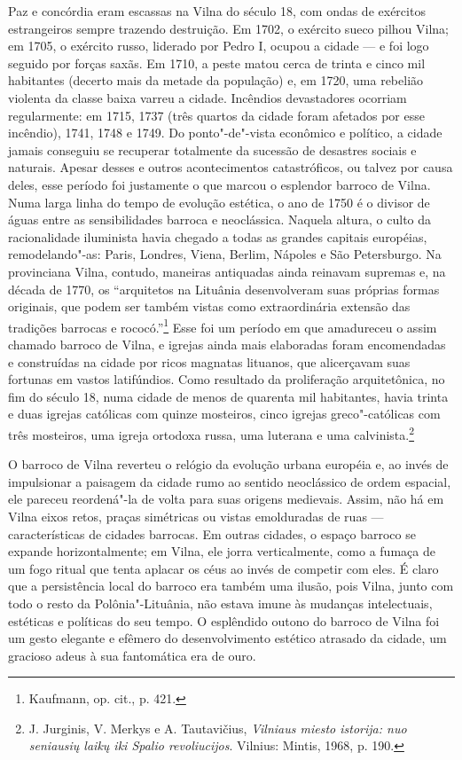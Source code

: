 Paz e concórdia eram escassas na Vilna do século 18, com ondas de
exércitos estrangeiros sempre trazendo destruição. Em 1702, o exército
sueco pilhou Vilna; em 1705, o exército russo, liderado por Pedro I,
ocupou a cidade --- e foi logo seguido por forças saxãs. Em 1710, a peste
matou cerca de trinta e cinco mil habitantes (decerto mais da metade da
população) e, em 1720, uma rebelião violenta da classe baixa varreu a
cidade. Incêndios devastadores ocorriam regularmente: em 1715, 1737
(três quartos da cidade foram afetados por esse incêndio), 1741, 1748 e
1749. Do ponto"-de"-vista econômico e político, a cidade jamais conseguiu
se recuperar totalmente da sucessão de desastres sociais e naturais.
Apesar desses e outros acontecimentos catastróficos, ou talvez por causa
deles, esse período foi justamente o que marcou o esplendor barroco de
Vilna. Numa larga linha do tempo de evolução estética, o ano de 1750 é o
divisor de águas entre as sensibilidades barroca e neoclássica. Naquela
altura, o culto da racionalidade iluminista havia chegado a todas as
grandes capitais européias, remodelando"-as: Paris, Londres, Viena,
Berlim, Nápoles e São Petersburgo. Na provinciana Vilna, contudo,
maneiras antiquadas ainda reinavam supremas e, na década de 1770, os
``arquitetos na Lituânia desenvolveram suas próprias formas originais,
que podem ser também vistas como extraordinária extensão das tradições
barrocas e rococó.''\footnote{Kaufmann, op. cit., p. 421.} Esse foi um
período em que amadureceu o assim chamado barroco de Vilna, e igrejas
ainda mais elaboradas foram encomendadas e construídas na cidade por
ricos magnatas lituanos, que alicerçavam suas fortunas em vastos
latifúndios. Como resultado da proliferação arquitetônica, no fim do
século 18, numa cidade de menos de quarenta mil habitantes, havia trinta
e duas igrejas católicas com quinze mosteiros, cinco igrejas
greco"-católicas com três mosteiros, uma igreja ortodoxa russa, uma
luterana e uma calvinista.\footnote{J. Jurginis, V. Merkys e A.
  Tautavičius, \emph{Vilniaus miesto istorija: nuo seniausių laikų iki
  Spalio revoliucijos}. Vilnius: Mintis, 1968, p. 190.}

%

O barroco de Vilna reverteu o relógio da evolução urbana européia e, ao
invés de impulsionar a paisagem da cidade rumo ao sentido neoclássico de
ordem espacial, ele pareceu reordená"-la de volta para suas origens
medievais. Assim, não há em Vilna eixos retos, praças simétricas ou
vistas emolduradas de ruas --- características de cidades barrocas. Em
outras cidades, o espaço barroco se expande horizontalmente; em Vilna,
ele jorra verticalmente, como a fumaça de um fogo ritual que tenta
aplacar os céus ao invés de competir com eles. É claro que a
persistência local do barroco era também uma ilusão, pois Vilna, junto
com todo o resto da Polônia"-Lituânia, não estava imune às mudanças
intelectuais, estéticas e políticas do seu tempo. O esplêndido outono do
barroco de Vilna foi um gesto elegante e efêmero do desenvolvimento
estético atrasado da cidade, um gracioso adeus à sua fantomática era de
ouro.

